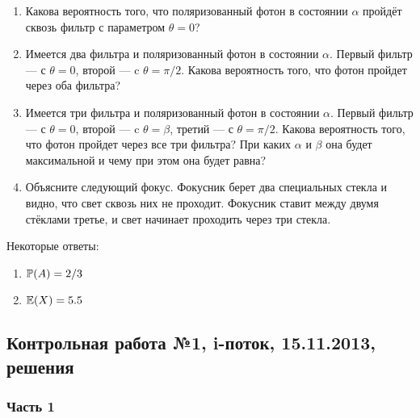 \begin{enumerate}
\begin{enumerate}
\item Какова вероятность того, что поляризованный фотон в состоянии $\alpha$ пройдёт сквозь фильтр с параметром $\theta=0$?
\item Имеется два фильтра и поляризованный фотон в состоянии $\alpha$. Первый фильтр — с $\theta=0$, второй — c $\theta=\pi/2$. Какова вероятность того, что фотон пройдет через оба фильтра?
\item Имеется три фильтра и поляризованный фотон в состоянии $\alpha$. Первый фильтр — с $\theta=0$, второй — c $\theta=\beta$, третий — с $\theta=\pi/2$. Какова вероятность того, что фотон пройдет через все три фильтра? При каких $\alpha$ и $\beta$ она будет максимальной и чему при этом она будет равна?
\item Объясните следующий фокус. Фокусник берет два специальных стекла и видно, что свет сквозь них не проходит. Фокусник ставит между двумя стёклами третье, и свет начинает проходить через три стекла.
\end{enumerate}


\end{enumerate}

Некоторые ответы:
\begin{enumerate}
\item $\P(A)=2/3$
\item $\E(X)=5.5$
\end{enumerate}

\subsection{Контрольная работа №1, i-поток, 15.11.2013, решения}

\subsubsection*{Часть 1}

